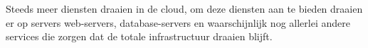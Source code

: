 Steeds meer diensten draaien in de cloud, om deze diensten aan te bieden draaien er op servers web-servers, database-servers en waarschijnlijk nog allerlei andere services die zorgen dat de totale infrastructuur draaien blijft.
